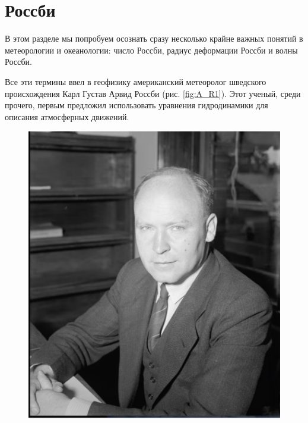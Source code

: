 \chapter{Россби}
В этом разделе мы попробуем осознать сразу несколько крайне важных понятий в метеорологии и океанологии: число Россби, радиус деформации Россби и волны Россби. 

Все эти термины ввел в геофизику американский метеоролог шведского происхождения Карл Густав Арвид Россби (рис. \ref{fig:A_R1}). Этот ученый, среди прочего, первым предложил использовать уравнения гидродинамики для описания атмосферных движений.  

    \begin{figure}
    \centering
    \begin{minipage}[b]{.5\textwidth} %
    \includegraphics[width=1\linewidth]{pics/A_R1.png}
    \end{minipage}%
    \begin{minipage}[b]{.5\textwidth} %
      \centering

\end{minipage}
\end{figure}
